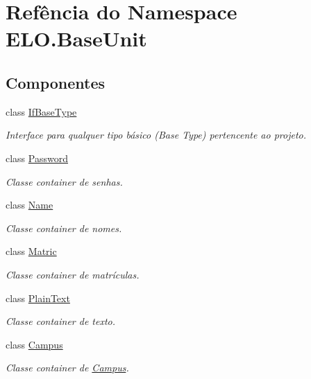 \hypertarget{namespaceELO_1_1BaseUnit}{\section{Refência do Namespace E\-L\-O.\-Base\-Unit}
\label{namespaceELO_1_1BaseUnit}
}
\subsection*{Componentes}
\begin{DoxyCompactItemize}
\item 
class \hyperlink{classELO_1_1BaseUnit_1_1IfBaseType}{If\-Base\-Type}
\begin{DoxyCompactList}\small\item\em Interface para qualquer tipo básico (Base Type) pertencente ao projeto. \end{DoxyCompactList}\item 
class \hyperlink{classELO_1_1BaseUnit_1_1Password}{Password}
\begin{DoxyCompactList}\small\item\em Classe container de senhas. \end{DoxyCompactList}\item 
class \hyperlink{classELO_1_1BaseUnit_1_1Name}{Name}
\begin{DoxyCompactList}\small\item\em Classe container de nomes. \end{DoxyCompactList}\item 
class \hyperlink{classELO_1_1BaseUnit_1_1Matric}{Matric}
\begin{DoxyCompactList}\small\item\em Classe container de matrículas. \end{DoxyCompactList}\item 
class \hyperlink{classELO_1_1BaseUnit_1_1PlainText}{Plain\-Text}
\begin{DoxyCompactList}\small\item\em Classe container de texto. \end{DoxyCompactList}\item 
class \hyperlink{classELO_1_1BaseUnit_1_1Campus}{Campus}
\begin{DoxyCompactList}\small\item\em Classe container de \hyperlink{classELO_1_1BaseUnit_1_1Campus}{Campus}. \end{DoxyCompactList}\item 

\end{DoxyCompactItemize}
